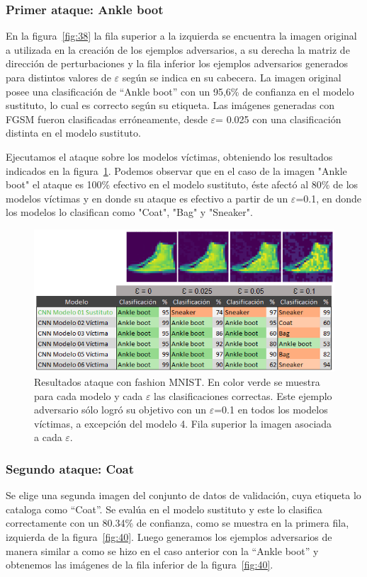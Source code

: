 \subsubsection{Primer ataque: Ankle boot}
En la figura~\ref{fig:38} la fila superior a la izquierda se encuentra la imagen original a utilizada en la creación de los ejemplos adversarios, a su derecha la matriz de dirección de perturbaciones y la fila inferior los ejemplos adversarios generados para distintos valores de $\varepsilon$ según se indica en su cabecera. La imagen original posee una clasificación de “Ankle boot” con un 95,6\% de confianza en el modelo sustituto, lo cual es correcto según su etiqueta. Las imágenes generadas con FGSM fueron clasificadas erróneamente, desde $\varepsilon$= 0.025 con una clasificación distinta en el modelo sustituto.


Ejecutamos el ataque sobre los modelos víctimas, obteniendo los resultados indicados en la figura~\ref{fig:39}. Podemos observar que en el caso de la imagen "Ankle boot" el ataque es 100\% efectivo en el modelo sustituto, éste afectó al 80\% de los modelos víctimas y en donde su ataque es efectivo a partir de un $\varepsilon$=0.1, en donde los modelos lo clasifican como "Coat", "Bag" y "Sneaker".

\begin{figure}[!h]
\centering
\includegraphics[scale = 0.90]{Figures/figura_39.PNG}
\decoRule
\caption[Resultados ataque 1 con fashion MNIST.]{Resultados ataque con fashion MNIST. En color verde se muestra para cada modelo y cada $\varepsilon$ las clasificaciones correctas. Este ejemplo adversario sólo logró su objetivo con un $\varepsilon$=0.1 en todos los modelos víctimas, a excepción del modelo 4. Fila superior la imagen asociada a cada $\varepsilon$.}
\label{fig:39}
\end{figure}



\subsubsection{Segundo ataque: Coat}
Se elige una segunda imagen del conjunto de datos de validación, cuya etiqueta lo cataloga como “Coat”. Se evalúa en el modelo sustituto y este lo clasifica correctamente con un 80.34\% de confianza, como se muestra en la primera fila, izquierda de la figura~\ref{fig:40}. Luego generamos los ejemplos adversarios de manera similar a como se hizo en el caso anterior con la “Ankle boot” y obtenemos las imágenes de la fila inferior de la figura~\ref{fig:40}.

